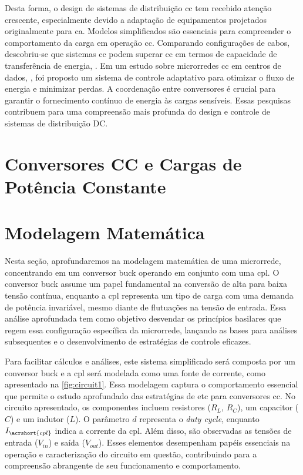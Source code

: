 Desta forma, o design de sistemas de distribuição \acrshort{cc} tem recebido atenção crescente, especialmente devido a adaptação de equipamentos projetados originalmente para \acrshort{ca}. Modelos simplificados são essenciais para compreender o comportamento da carga em operação \acrshort{cc}. Comparando configurações de cabos, descobriu-se que sistemas \acrshort{cc} podem superar \acrshort{cc} em termos de capacidade de transferência de energia, \cite{Salomonsson2007}. Em um estudo sobre microrredes \acrshort{cc} em centros de dados, \cite{Salomonsson2008}, foi proposto um sistema de controle adaptativo para otimizar o fluxo de energia e minimizar perdas. A coordenação entre conversores é crucial para garantir o fornecimento contínuo de energia às cargas sensíveis. Essas pesquisas contribuem para uma compreensão mais profunda do design e controle de sistemas de distribuição DC.

\section{Conversores CC e Cargas de Potência Constante}



\section{Modelagem Matemática}

Nesta seção, aprofundaremos na modelagem matemática de uma microrrede, concentrando em um conversor buck operando em conjunto com uma \acrshort{cpl}. O conversor buck assume um papel fundamental na conversão de alta para baixa tensão contínua, enquanto a \acrshort{cpl} representa um tipo de carga com uma demanda de potência invariável, mesmo diante de flutuações na tensão de entrada. Essa análise aprofundada tem como objetivo desvendar os princípios basilares que regem essa configuração específica da microrrede, lançando as bases para análises subsequentes e o desenvolvimento de estratégias de controle eficazes.

Para facilitar cálculos e análises, este sistema simplificado será composta por um conversor buck e a \acrshort{cpl} será modelada como uma fonte de corrente, como apresentado na \autoref{fig:circuit1}. Essa modelagem captura o comportamento essencial que permite o estudo aprofundado das estratégias de \acrshort{etc} para conversores \acrshort{cc}. No circuito apresentado, os componentes incluem resistores ($R_L$, $R_C$), um capacitor ($C$) e um indutor ($L$). O parâmetro $d$ representa o \textit{duty cycle}, enquanto $I_{\acrshort{cpl}}$ indica a corrente da \acrshort{cpl}. Além disso, são observadas as tensões de entrada ($V_{in}$) e saída ($V_{out}$). Esses elementos desempenham papéis essenciais na operação e caracterização do circuito em questão, contribuindo para a compreensão abrangente de seu funcionamento e comportamento.

